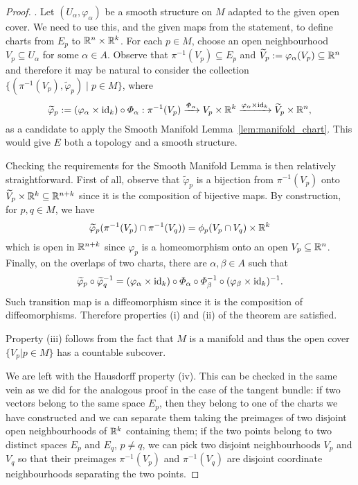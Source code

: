 \begin{proof}
  .
Let $(U_\alpha, \varphi_\alpha)$ be a smooth structure on $M$ adapted to the given open cover.
We need to use this, and the given maps from the statement, to define charts from $E_p$ to $\mathbb{R}^n\times\mathbb{R}^k$.
For each $p\in M$, choose an open neighbourhood $V_p \subseteq U_\alpha$ for some $\alpha\in A$.
Observe that $\pi^{-1}(V_p) \subseteq E_p$ and $\widetilde{V}_p := \varphi_\alpha(V_p) \subseteq \mathbb{R}^n$ and therefore it may be natural to consider the collection $\{(\pi^{-1}(V_p), \widetilde{\varphi}_p)\mid p\in M\}$, where
\begin{equation}
  \widetilde{\varphi}_p := (\varphi_\alpha\times \operatorname{id}_k) \circ \varPhi_\alpha : \pi^{-1}(V_p) \xrightarrow{\varPhi_\alpha} V_p\times\mathbb{R}^k \xrightarrow{\varphi_\alpha\times \operatorname{id}_k} \widetilde{V}_p\times \mathbb{R}^n,
\end{equation}
as a candidate to apply the Smooth Manifold Lemma~\ref{lem:manifold_chart}.
This would give $E$ both a topology and a smooth structure.

Checking the requirements for the Smooth Manifold Lemma is then relatively straightforward.
First of all, observe that $\widetilde{\varphi}_p$ is a bijection from $\pi^{-1}(V_p)$ onto $\widetilde{V}_p\times\mathbb{R}^k \subseteq \mathbb{R}^{n+k}$ since it is the composition of bijective maps.
By construction, for $p,q\in M$, we have
\begin{equation}
  \widetilde{\varphi}_p(\pi^{-1}(V_p) \cap \pi^{-1}(V_q)) = \phi_p(V_p\cap V_q)\times \mathbb{R}^k
\end{equation}
which is open in $\mathbb{R}^{n+k}$ since $\varphi_p$ is a homeomorphism onto an open $V_p\subseteq\mathbb{R}^n$.
Finally, on the overlaps of two charts, there are $\alpha, \beta\in A$ such that
\begin{equation}
  \widetilde{\varphi}_p \circ \widetilde{\varphi}_q^{-1} =
  (\varphi_\alpha \times \operatorname{id}_k) \circ \varPhi_\alpha \circ \varPhi_\beta^{-1} \circ (\varphi_\beta \times \operatorname{id}_k)^{-1}.
\end{equation}
Such transition map is a diffeomorphism since it is the composition of diffeomorphisms.
Therefore properties (i) and (ii) of the theorem are satisfied.

Property (iii) follows from the fact that $M$ is a manifold and thus the open cover $\{V_p | p \in M\}$ has a countable subcover.

We are left with the Hausdorff property (iv).
This can be checked in the same vein as we did for the analogous proof in the case of the tangent bundle:
if two vectors belong to the same space $E_p$, then they belong to one of the charts we have constructed and we can separate them taking the preimages of two disjoint open neighbourhoods of $\mathbb{R}^k$ containing them; if the two points belong to two distinct spaces $E_p$ and $E_q$, $p\neq q$, we can pick two disjoint neighbourhoods $V_p$ and $V_q$ so that their preimages $\pi^{-1}(V_p)$ and $\pi^{-1}(V_q)$ are disjoint coordinate neighbourhoods separating the two points.


\end{proof}
